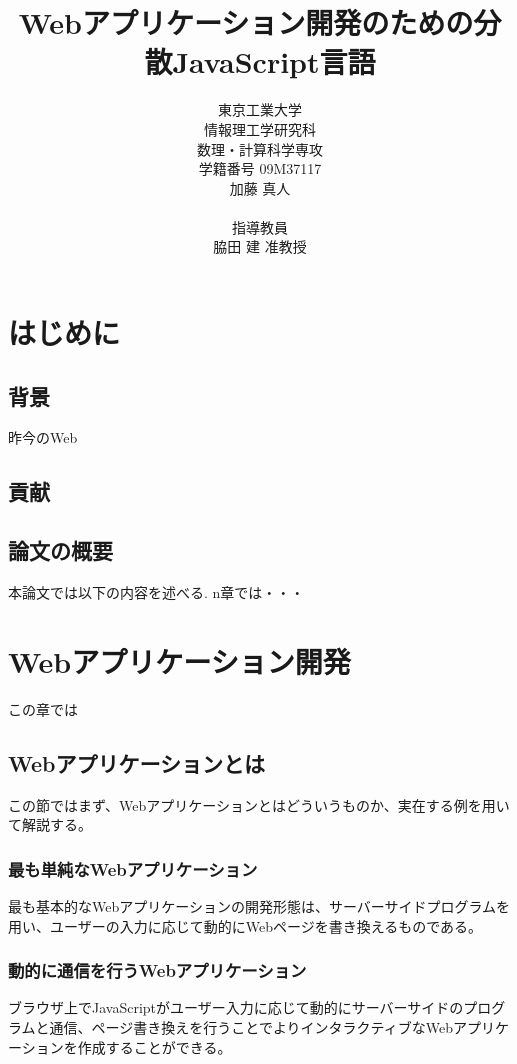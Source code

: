\documentclass[a4j,12pt]{jreport}
\title {Webアプリケーション開発のための分散JavaScript言語}
\author{東京工業大学 \\情報理工学研究科 \\数理・計算科学専攻 \\学籍番号 09M37117\\加藤 真人\\\\指導教員\\脇田 建 准教授}
\begin{document}
\maketitle
\tableofcontents
\listoffigures


\chapter{はじめに}
\section{背景}
昨今のWeb
\section{貢献}

\section{論文の概要}
 本論文では以下の内容を述べる.
 n章では・・・

\chapter{Webアプリケーション開発}
この章では
\section{Webアプリケーションとは}
この節ではまず、Webアプリケーションとはどういうものか、実在する例を用いて解説する。

\subsection{最も単純なWebアプリケーション}
最も基本的なWebアプリケーションの開発形態は、サーバーサイドプログラムを用い、ユーザーの入力に応じて動的にWebページを書き換えるものである。

\subsection{動的に通信を行うWebアプリケーション}
ブラウザ上でJavaScriptがユーザー入力に応じて動的にサーバーサイドのプログラムと通信、ページ書き換えを行うことでよりインタラクティブなWebアプリケーションを作成することができる。
\end{document}

